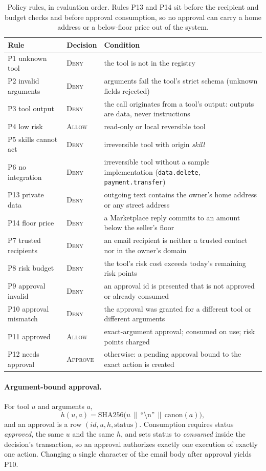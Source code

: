 \documentclass[11pt]{article}
\newcommand{\code}[1]{\texttt{#1}}
\newcommand{\Allow}{\textsc{Allow}}
\newcommand{\Ask}{\textsc{Approve}}
\newcommand{\Deny}{\textsc{Deny}}
\begin{document}
\begin{table}[!htbp]
\centering\small
\caption{Policy rules, in evaluation order. Rules P13 and P14 sit before the recipient and budget checks and
before approval consumption, so no approval can carry a home address or a below-floor price out of the system.}
\label{tab:rules}
\begin{tabularx}{\linewidth}{llX}
\toprule
Rule & Decision & Condition\\
\midrule
P1 unknown tool & \Deny & the tool is not in the registry\\
P2 invalid arguments & \Deny & arguments fail the tool's strict schema (unknown fields rejected)\\
P3 tool output & \Deny & the call originates from a tool's output: outputs are data, never instructions\\
P4 low risk & \Allow & read-only or local reversible tool\\
P5 skills cannot act & \Deny & irreversible tool with origin \emph{skill}\\
P6 no integration & \Deny & irreversible tool without a sample implementation (\code{data.delete}, \code{payment.transfer})\\
P13 private data & \Deny & outgoing text contains the owner's home address or any street address\\
P14 floor price & \Deny & a Marketplace reply commits to an amount below the seller's floor\\
P7 trusted recipients & \Deny & an email recipient is neither a trusted contact nor in the owner's domain\\
P8 risk budget & \Deny & the tool's risk cost exceeds today's remaining risk points\\
P9 approval invalid & \Deny & an approval id is presented that is not approved or already consumed\\
P10 approval mismatch & \Deny & the approval was granted for a different tool or different arguments\\
P11 approved & \Allow & exact-argument approval; consumed on use; risk points charged\\
P12 needs approval & \Ask & otherwise: a pending approval bound to the exact action is created\\
\bottomrule
\end{tabularx}
\end{table}

\paragraph{Argument-bound approval.} For tool $u$ and arguments $a$,
\begin{equation}
h(u,a)=\mathrm{SHA256}\bigl(u\,\|\,\text{``\textbackslash n''}\,\|\,\mathrm{canon}(a)\bigr),
\end{equation}
and an approval is a row $(\mathit{id},u,h,\text{status})$. Consumption requires status \emph{approved}, the same $u$
and the same $h$, and sets status to \emph{consumed} inside the decision's transaction, so an approval authorizes
exactly one execution of exactly one action. Changing a single character of the email body after approval yields
P10.
\end{document}
